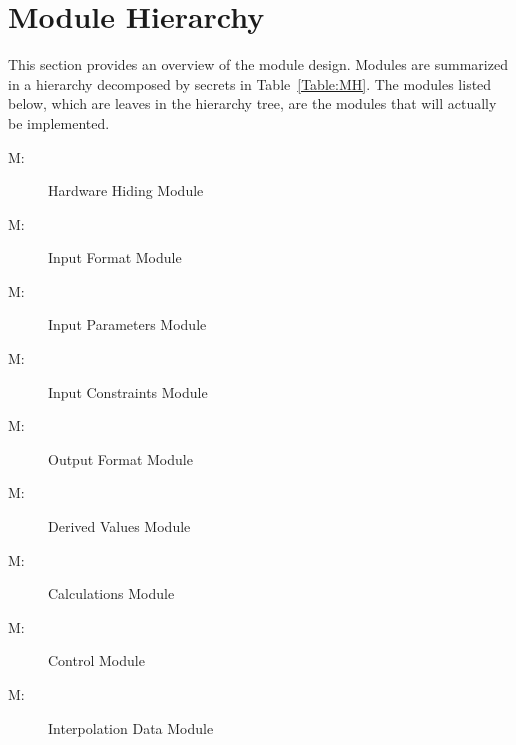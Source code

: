 \documentclass[12pt]{article}
\newcounter{modnum}
\newcommand{\mthemodnum}{M\themodnum}
\begin{document}
\section{Module Hierarchy}
\label{Sec:MH}
This section provides an overview of the module design. Modules are summarized in a hierarchy decomposed by secrets in Table~\ref{Table:MH}. The modules listed below, which are leaves in the hierarchy tree, are the modules that will actually be implemented.
\begin{description}
\item[\mthemodnum\label{MhwHiding}:]Hardware Hiding Module
\end{description}
\begin{description}
\item[\mthemodnum\label{MmodInputFormat}:]Input Format Module
\end{description}
\begin{description}
\item[\mthemodnum\label{MmodInputParams}:]Input Parameters Module
\end{description}
\begin{description}
\item[\mthemodnum\label{MmodInputConstraints}:]Input Constraints Module
\end{description}
\begin{description}
\item[\mthemodnum\label{Mmodoutputfdesc}:]Output Format Module
\end{description}
\begin{description}
\item[\mthemodnum\label{MmodDerivedVals}:]Derived Values Module
\end{description}
\begin{description}
\item[\mthemodnum\label{Mmodcalcdesc}:]Calculations Module
\end{description}
\begin{description}
\item[\mthemodnum\label{MmodControl}:]Control Module
\end{description}
\begin{description}
\item[\mthemodnum\label{MmodInterpData}:]Interpolation Data Module
\end{description}
\end{document}
